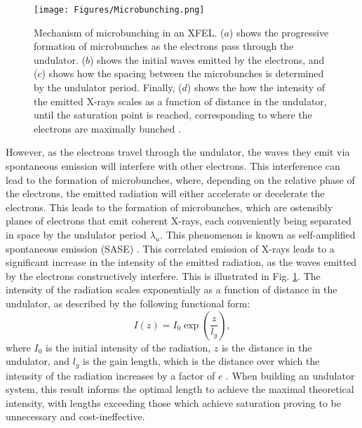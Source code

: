 \documentclass[aps,prb,twocolumn,superscriptaddress]{revtex4-2}
\begin{document}
\begin{figure}[h]
    \centering
    \texttt{[image: Figures/Microbunching.png]}
    \caption{Mechanism of microbunching in an XFEL. ($a$) shows the progressive
        formation of microbunches as the electrons pass through the undulator.
        ($b$) shows the initial waves emitted by the electrons, and ($c$) shows
        how the spacing between the microbunches is determined by the undulator
        period. Finally, ($d$) shows the how the intensity of the emitted X-rays
        scales as a function of distance in the undulator, until the saturation
        point is reached, corresponding to where the electrons are maximally 
        bunched \cite{EMMA}.}
    \label{fig:Undulator}
\end{figure}
However, as the electrons travel through the
undulator, the waves they emit via spontaneous emission will interfere with 
other electrons. This interference can lead to the formation of microbunches,
where, depending on the relative phase of the electrons, the emitted radiation
will either accelerate or decelerate the electrons. This leads to the formation
of microbunches, which are ostensibly planes of electrons that emit coherent
X-rays, each conveniently being separated in space by the undulator period
$\lambda_u$. This phenomenon is known as self-amplified spontaneous emission 
(SASE) \cite{Saldin2006}.
This correlated emission of X-rays leads to a significant increase in the intensity
of the emitted radiation, as the waves emitted by the electrons constructively
interfere. This is illustrated in Fig. \ref{fig:Undulator}. The intensity of the
radiation scales exponentially as a function of distance in the undulator, as described 
by the following functional form:
\begin{equation}
    I(z) = I_0\exp\left(\frac{z}{l_g}\right),
\end{equation}
where $I_0$ is the initial intensity of the radiation, $z$ is the distance in the
undulator, and $l_g$ is the gain length, which is the distance over which the
intensity of the radiation increases by a factor of $e$ \cite{Bonifacio}. When 
building an undulator system, this result informs the optimal length to achieve 
the maximal theoretical intensity, with lengths exceeding those which achieve saturation 
proving to be unnecessary and cost-ineffective.
\end{document}
